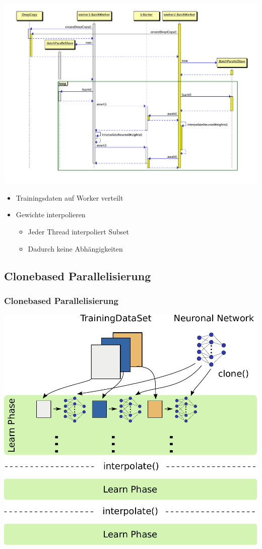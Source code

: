 \documentclass[18pt]{beamer}
\begin{document}
\begin{frame}[c,allowframebreaks]
	\framebreak
		\begin{center}
			\includegraphics[scale=0.33]{Grafiken/Batch_seq.pdf}
		\end{center}

	\framebreak

		\begin{itemize}
			\item Trainingsdaten auf Worker verteilt
			\item Gewichte interpolieren
			\begin{itemize}
				\item Jeder Thread interpoliert Subset
				\item Dadurch keine Abhängigkeiten
			\end{itemize}
		\end{itemize}
	\end{frame}
	
	\subsection{Clonebased Parallelisierung}
	\begin{frame}\frametitle{Clonebased Parallelisierung}
		\begin{center}
			\includegraphics[width=.65\textwidth]{images/Parallelisierungsansatz.pdf} 
		\end{center}
	\end{frame}
	
\end{document}
